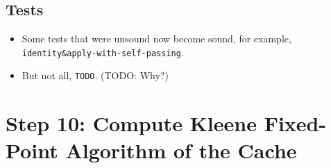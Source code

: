 \documentclass[12pt, oneside]{book}
\begin{document}
\subsection{Tests}

\begin{itemize}
  \item Some tests that were unsound now become sound, for example, \texttt{identity\&apply-with-self-passing}.
  \item But not all, \texttt{TODO}. (TODO: Why?)
\end{itemize}

\section{Step 10: Compute Kleene Fixed-Point Algorithm of the Cache}
\end{document}
